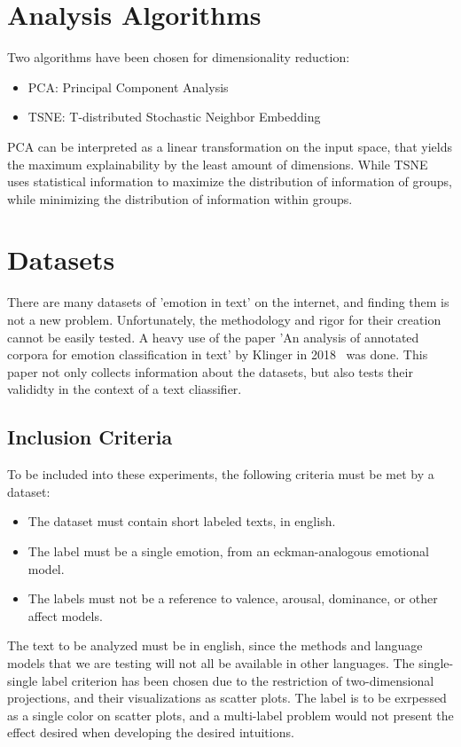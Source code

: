 \section{Analysis Algorithms}\label{sec:Analysis Algorithms}
Two algorithms have been chosen for dimensionality reduction:
\begin{itemize}
  \item PCA: Principal Component Analysis
  \item TSNE: T-distributed Stochastic Neighbor Embedding
\end{itemize}

PCA can be interpreted as a linear transformation on the input space, that yields the maximum explainability by the least amount of dimensions. While TSNE uses statistical information to maximize the distribution of information of groups, while minimizing the distribution of information within groups.

\section{Datasets}\label{sec:Datasets}
There are many datasets of 'emotion in text' on the internet, and finding them is not a new problem. Unfortunately, the methodology and rigor for their creation cannot be easily tested. A heavy use of the paper 'An analysis of annotated corpora for emotion classification in text' by Klinger in 2018~\cite{klinger2018analysis} was done. This paper not only collects information about the datasets, but also tests their valididty in the context of a text cliassifier.

\subsection{Inclusion Criteria}\label{sub:Inclusion Criteria}
To be included into these experiments, the following criteria must be met by a dataset:
\begin{itemize}
  \item The dataset must contain short labeled texts, in english.
  \item The label must be a single emotion, from an eckman-analogous emotional model.
  \item The labels must not be a reference to valence, arousal, dominance, or other affect models.
\end{itemize}
The text to be analyzed must be in english, since the methods and language models that we are testing will not all be available in other languages. The single-single label criterion has been chosen due to the restriction of two-dimensional projections, and their visualizations as scatter plots. The label is to be exrpessed as a single color on scatter plots, and a multi-label problem would not present the effect desired  when developing the desired intuitions.

